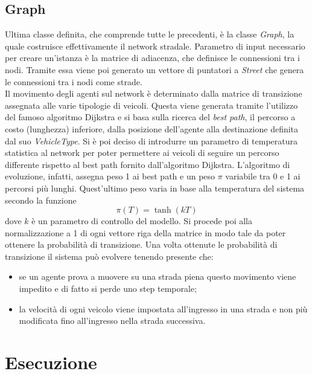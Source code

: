 \documentclass[../main.tex]{subfiles}
\begin{document}
\subsection{Graph}
Ultima classe definita, che comprende tutte le precedenti, \`e la classe \emph{Graph}, la quale costruisce effettivamente il network stradale.
Parametro di input necessario per creare un'istanza \`e la matrice di adiacenza, che definisce le connessioni tra i nodi.
Tramite essa viene poi generato un vettore di puntatori a \emph{Street} che genera le connessioni tra i nodi come strade.\\
Il movimento degli agenti sul network \`e determinato dalla matrice di transizione assegnata alle varie tipologie di veicoli.
Questa viene generata tramite l'utilizzo del famoso algoritmo Dijkstra \cite{dijkstra} e si basa sulla ricerca del \emph{best path}, il percorso a costo (lunghezza) inferiore, dalla posizione dell'agente alla destinazione definita dal suo \emph{VehicleType}.
Si \`e poi deciso di introdurre un parametro di temperatura statistica al network per poter permettere ai veicoli di seguire un percorso differente rispetto al best path fornito dall'algoritmo Dijkstra.
L'algoritmo di evoluzione, infatti, assegna peso 1 ai best path e un peso $\pi$ variabile tra 0 e 1 ai percorsi più lunghi.
Quest'ultimo peso varia in base alla temperatura del sistema secondo la funzione
\begin{equation}
    \pi(T)=\tanh(kT)
\end{equation}
dove $k$ \`e un parametro di controllo del modello.
Si procede poi alla normalizzazione a 1 di ogni vettore riga della matrice in modo tale da poter ottenere la probabilità di transizione.
Una volta ottenute le probabilità di transizione il sistema può evolvere tenendo presente che:
\begin{itemize}
    \item se un agente prova a muovere su una strada piena questo movimento viene impedito e di fatto si perde uno step temporale;
    \item la velocità di ogni veicolo viene impostata all'ingresso in una strada e non più modificata fino all'ingresso nella strada successiva. 
\end{itemize}

\section{Esecuzione}
\end{document}
